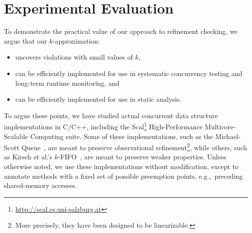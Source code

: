 \section{Experimental Evaluation}
\label{sec:exp}

To demonstrate the practical value of our approach to refinement checking,
we argue that our $k$-approximation:
\begin{itemize}

  \item uncovers violations with small values of $k$,

  \item can be efficiently implemented for use in systematic concurrency
  testing and long-term runtime monitoring, and
  
  \item can be efficiently implemented for use in static analysis.

\end{itemize}

To argue these points, we have studied actual concurrent data structure
implementations in C/C++, including the
Scal\footnote{\url{http://scal.cs.uni-salzburg.at}} High-Performance
Multicore-Scalable Computing suite. Some of these implementations, such as the
Michael-Scott Queue~\cite{conf/podc/MichaelS96}, are meant to preserve
observational refinement\footnote{More precisely, they have been designed to be
linearizable.}, while others, such as Kirsch et al.'s
$k$-FIFO~\cite{conf/pact/KirschLP13}, are meant to preserve weaker properties.
Unless otherwise noted, we use these implementations without modification,
except to annotate methods with a fixed set of possible preemption points,
e.g.,~preceding shared-memory accesses.

